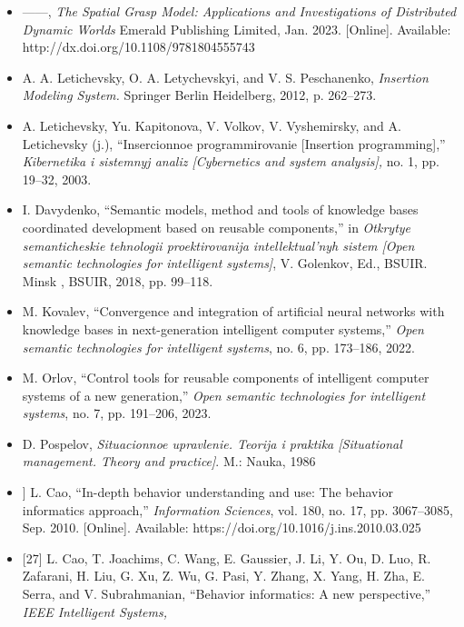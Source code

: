 \documentclass {article}
\begin{document}
\begin{multicols}{2}
\begin{itemize}
\renewcommand{\labelitemi}{[19]}
\item ——,\textit { The Spatial Grasp Model: Applications and
 Investigations of Distributed Dynamic Worlds} Emerald
Publishing Limited, Jan. 2023. [Online]. Available:
http://dx.doi.org/10.1108/9781804555743
\renewcommand{\labelitemi}{[20]}
\item A. A. Letichevsky, O. A. Letychevskyi, and V. S. Peschanenko,
\textit{Insertion Modeling System.} Springer Berlin Heidelberg, 2012, p.
262–273.
\renewcommand{\labelitemi}{[21]}
\item A. Letichevsky, Yu. Kapitonova, V. Volkov, V. Vyshemirsky, and
A. Letichevsky (j.), “Insercionnoe programmirovanie [Insertion
programming],”\textit { Kibernetika i sistemnyj analiz [Cybernetics and
system analysis],} no. 1, pp. 19–32, 2003.
\renewcommand{\labelitemi}{[22]}
\item  I. Davydenko, “Semantic models, method and tools of knowledge bases coordinated development based on reusable components,” in \textit { Otkrytye semanticheskie tehnologii proektirovanija
intellektual’nyh sistem [Open semantic technologies for intelligent
systems]}, V. Golenkov, Ed., BSUIR. Minsk , BSUIR, 2018, pp.
99–118.
\renewcommand{\labelitemi}{[23]}
\item M. Kovalev, “Convergence and integration of artificial neural
networks with knowledge bases in next-generation intelligent
computer systems,”\textit { Open semantic technologies for intelligent
systems}, no. 6, pp. 173–186, 2022.
\renewcommand{\labelitemi}{[24]}
\item
M. Orlov, “Control tools for reusable components of intelligent
computer systems of a new generation,”\textit { Open semantic technologies for intelligent systems}, no. 7, pp. 191–206, 2023.
\renewcommand{\labelitemi}{[25]}
\item D. Pospelov,\textit {  Situacionnoe upravlenie. Teorija i praktika
[Situational management. Theory and practice]}. M.: Nauka,
1986
\renewcommand{\labelitemi}{[26]}
\item
] L. Cao, “In-depth behavior understanding and use: The
behavior informatics approach,”\textit {  Information Sciences}, vol.
180, no. 17, pp. 3067–3085, Sep. 2010. [Online]. Available:
https://doi.org/10.1016/j.ins.2010.03.025
\renewcommand{\labelitemi}{[27]}
\item
{[27]} L. Cao, T. Joachims, C. Wang, E. Gaussier, J. Li, Y. Ou,
D. Luo, R. Zafarani, H. Liu, G. Xu, Z. Wu, G. Pasi, Y. Zhang,
X. Yang, H. Zha, E. Serra, and V. Subrahmanian, “Behavior
informatics: A new perspective,”\textit { IEEE Intelligent Systems,}

\end{itemize}
\end{multicols}
\end{document}
